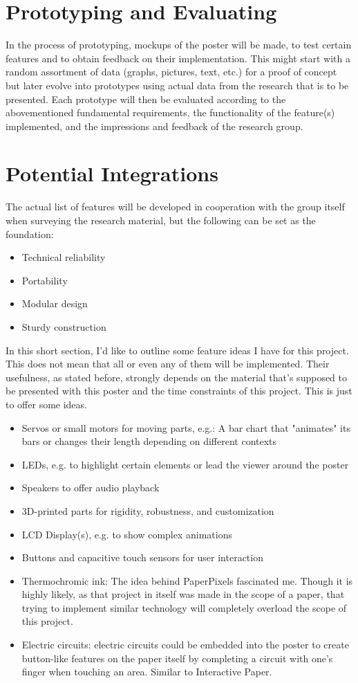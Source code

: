 \section{Prototyping and Evaluating}
In the process of prototyping, mockups of the poster will be made, to test certain features and to obtain feedback on their implementation. This might start with a random assortment of data (graphs, pictures, text, etc.) for a proof of concept but later evolve into prototypes using actual data from the research that is to be presented. Each prototype will then be evaluated according to the abovementioned fundamental requirements, the functionality of the feature(s) implemented, and the impressions and feedback of the research group.

\section{Potential Integrations}
The actual list of features will be developed in cooperation with the group itself when surveying the research material, but the following can be set as the foundation:
\begin{itemize}
	\item Technical reliability
	\item Portability
	\item Modular design
	\item Sturdy construction
\end{itemize}
In this short section, I'd like to outline some feature ideas I have for this project. This does not mean that all or even any of them will be implemented. Their usefulness, as stated before, strongly depends on the material that's supposed to be presented with this poster and the time constraints of this project. This is just to offer some ideas.
\begin{itemize}
	\item Servos or small motors for moving parts, e.g.: A bar chart that "animates" its bars or changes their length depending on different contexts
	\item LEDs, e.g. to highlight certain elements or lead the viewer around the poster
	\item Speakers to offer audio playback
	\item 3D-printed parts for rigidity, robustness, and customization
	\item LCD Display(s), e.g. to show complex animations
	\item Buttons and capacitive touch sensors for user interaction
	\item Thermochromic ink: The idea behind PaperPixels fascinated me. Though it is highly likely, as that project in itself was made in the scope of a paper, that trying to implement similar technology will completely overload the scope of this project.
	\item Electric circuits: electric circuits could be embedded into the poster to create button-like features on the paper itself by completing a circuit with one's finger when touching an area. Similar to Interactive Paper.
\end{itemize}
